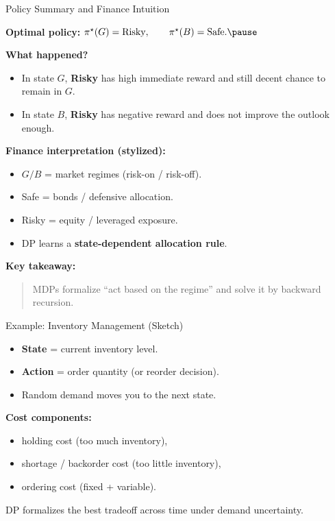 \documentclass[aspectratio=169]{beamer}
\begin{document}
\begin{frame}{Policy Summary and Finance Intuition}

\textbf{Optimal policy:}
$
\pi^\star(G)=\text{Risky},\qquad \pi^\star(B)=\text{Safe}.\pause
$

\medskip
\textbf{What happened?}
\begin{itemize}
  \item In state $G$, \textbf{Risky} has high immediate reward and still decent chance to remain in $G$.\pause
  \item In state $B$, \textbf{Risky} has negative reward and does not improve the outlook enough.\pause
\end{itemize}

\medskip
\textbf{Finance interpretation (stylized):}
\begin{itemize}
  \item $G/B$ = market regimes (risk-on / risk-off).\pause
  \item Safe = bonds / defensive allocation.\pause
  \item Risky = equity / leveraged exposure.\pause
  \item DP learns a \textbf{state-dependent allocation rule}.\pause
\end{itemize}

\medskip
\textbf{Key takeaway:}
\begin{quote}
MDPs formalize ``act based on the regime'' and solve it by backward recursion.
\end{quote}
\end{frame}




\begin{frame}{Example: Inventory Management (Sketch)}
\begin{itemize}
  \item \textbf{State} = current inventory level.\pause
  \item \textbf{Action} = order quantity (or reorder decision).\pause
  \item Random demand moves you to the next state.\pause
\end{itemize}

\medskip

\textbf{Cost components:}
\begin{itemize}
  \item holding cost (too much inventory),\pause
  \item shortage / backorder cost (too little inventory),\pause
  \item ordering cost (fixed + variable).
\end{itemize}

\medskip
DP formalizes the best tradeoff across time under demand uncertainty.
\end{frame}
\end{document}
